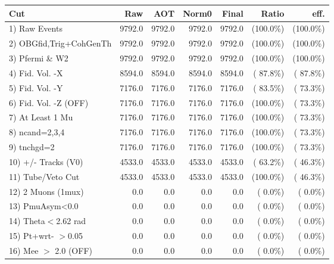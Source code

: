  \begin{table}[h!]\centering
 \begin{tabular}{||l||r|r|r|r|r|r||}
 \hline
 \hline
 Cut & Raw & AOT & Norm0 & Final & Ratio & eff.       \\
 \hline
  1) Raw Events           &       9792.0 &       9792.0 &       9792.0 &       9792.0 & (100.0\%) & (100.0\%) \\
  2) OBGfid,Trig+CohGenTh &       9792.0 &       9792.0 &       9792.0 &       9792.0 & (100.0\%) & (100.0\%) \\
  3) Pfermi \& W2         &       9792.0 &       9792.0 &       9792.0 &       9792.0 & (100.0\%) & (100.0\%) \\
  4) Fid. Vol. -X         &       8594.0 &       8594.0 &       8594.0 &       8594.0 & ( 87.8\%) & ( 87.8\%) \\
  5) Fid. Vol. -Y         &       7176.0 &       7176.0 &       7176.0 &       7176.0 & ( 83.5\%) & ( 73.3\%) \\
  6) Fid. Vol. -Z (OFF)   &       7176.0 &       7176.0 &       7176.0 &       7176.0 & (100.0\%) & ( 73.3\%) \\
  7) At Least 1 Mu        &       7176.0 &       7176.0 &       7176.0 &       7176.0 & (100.0\%) & ( 73.3\%) \\
  8) ncand=2,3,4          &       7176.0 &       7176.0 &       7176.0 &       7176.0 & (100.0\%) & ( 73.3\%) \\
  9) tnchgd=2             &       7176.0 &       7176.0 &       7176.0 &       7176.0 & (100.0\%) & ( 73.3\%) \\
 10) +/- Tracks (V0)      &       4533.0 &       4533.0 &       4533.0 &       4533.0 & ( 63.2\%) & ( 46.3\%) \\
 11) Tube/Veto Cut        &       4533.0 &       4533.0 &       4533.0 &       4533.0 & (100.0\%) & ( 46.3\%) \\
 12) 2 Muons (1mux)       &          0.0 &          0.0 &          0.0 &          0.0 & (  0.0\%) & (  0.0\%) \\
 13) PmuAsym<0.0          &          0.0 &          0.0 &          0.0 &          0.0 & (  0.0\%) & (  0.0\%) \\
 14) Theta$<$2.62 rad     &          0.0 &          0.0 &          0.0 &          0.0 & (  0.0\%) & (  0.0\%) \\
 15) Pt+wrt- $>$0.05      &          0.0 &          0.0 &          0.0 &          0.0 & (  0.0\%) & (  0.0\%) \\
 16) Mee $>$ 2.0  (OFF)   &          0.0 &          0.0 &          0.0 &          0.0 & (  0.0\%) & (  0.0\%) \\

\end{tabular}
\end{table}
